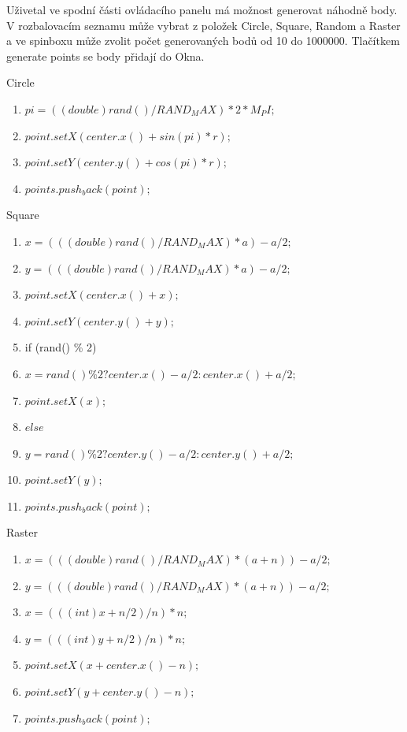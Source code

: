 \documentclass[a4paper, 12pt]{article}
\begin{document}
Uživetal ve spodní části ovládacího panelu má možnost generovat náhodně body. V rozbalovacím seznamu může vybrat z položek Circle, Square, Random a Raster a ve spinboxu může zvolit počet generovaných bodů od 10 do 1000000. Tlačítkem generate points se body přidají do Okna.

Circle
\begin{enumerate}
\item $  pi = ((double)rand() / RAND_MAX) * 2 * M_PI; $
\item $              point.setX(center.x() + sin(pi) * r);$
\item $              point.setY(center.y() + cos(pi) * r);$
\item $              points.push_back(point);$
\end{enumerate}

Square
\begin{enumerate}
\item $x = (((double)rand() / RAND_MAX) * a) - a/2;$
\item $y = (((double)rand() / RAND_MAX) * a) - a/2;$
\item $point.setX(center.x() + x);$
\item $point.setY(center.y() + y);$
\item if (rand() \% 2)
\item $x = rand() \% 2 ? center.x() - a/2 : center.x() + a/2;$
\item $point.setX(x);$
\item $else $
\item $y = rand() \% 2 ? center.y() - a/2 : center.y() + a/2;$
\item $point.setY(y);$
\item $points.push_back(point);$
\end{enumerate}

Raster
\begin{enumerate}
\item $x = (((double)rand() / RAND_MAX) * (a+n)) - a/2;$
\item $            y = (((double)rand() / RAND_MAX) * (a+n)) - a/2;$
\item $            x = (((int)x + n/2) / n) * n;$
\item $            y = (((int)y + n/2) / n) * n;$
\item $            point.setX(x + center.x() - n);$
\item $            point.setY(y + center.y() - n);$
\item $            points.push_back(point);$
\end{enumerate}
\end{document}
